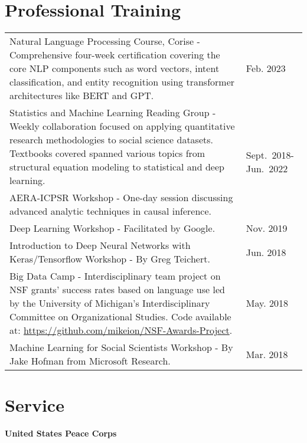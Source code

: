 \documentclass[margin,line]{res}
\begin{document}
\begin{resume}
\section{\sc Professional Training}
\begin{tabular}{@{}p{4in}p{1.5in}}
  Natural Language Processing Course, Corise - Comprehensive four-week certification covering the core NLP components such as word vectors, intent classification, and entity recognition using transformer architectures like BERT and GPT. & Feb. 2023 \\
  Statistics and Machine Learning Reading Group - Weekly collaboration focused on applying quantitative research methodologies to social science datasets. Textbooks covered spanned various topics from structural equation modeling to statistical and deep learning. &\multirow{2}{1in}{Sept.~2018-Jun.~2022}\\
  AERA-ICPSR Workshop - One-day session discussing advanced analytic techniques in causal inference. & Feb. 2021 \\
  Deep Learning Workshop - Facilitated by Google. & Nov. 2019\\
  Introduction to Deep Neural Networks with Keras/Tensorflow Workshop - By Greg Teichert. & Jun. 2018 \\
  Big Data Camp - Interdisciplinary team project on NSF grants' success rates based on language use led by the University of Michigan's Interdisciplinary Committee on Organizational Studies. Code available at: \href{https://github.com/mikeion/NSF-Awards-Project}{https://github.com/mikeion/NSF-Awards-Project}. & May. 2018 \\
  Machine Learning for Social Scientists Workshop - By Jake Hofman from Microsoft Research. & Mar. 2018 \\
\end{tabular}



  \section{\sc Service} 
  {\bf United States Peace Corps}\\

\end{resume}
\end{document}
